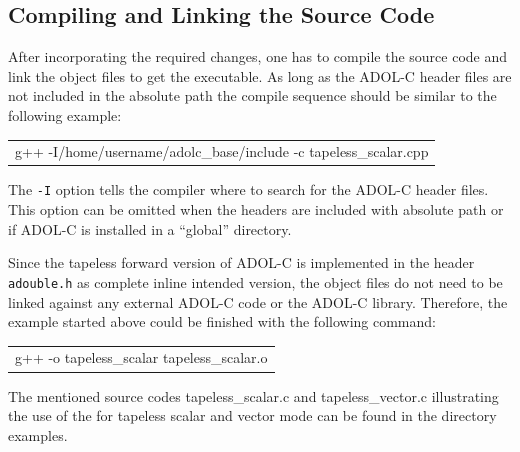 \documentclass[11pt,twoside]{article}
\begin{document}
\subsection{Compiling and Linking the Source Code}
%
After incorporating the required changes, one has to compile the
source code and link the object files to get the executable. 
As long as the ADOL-C header files are not included in the absolute path
the compile sequence should be similar to the following example:
\begin{center}
  \begin{tabular}{l}
    {\sf g++ -I/home/username/adolc\_base/include -c tapeless\_scalar.cpp}
  \end{tabular}
\end{center}
The \verb#-I# option tells the compiler where to search for the ADOL-C
header files. This option can be omitted when the headers are included
with absolute path or if ADOL-C is installed in a ``global'' directory. 

Since the tapeless forward version of ADOL-C is implemented in the
header \verb#adouble.h# as complete inline intended version,
the object files do not need to be linked against any external ADOL-C
code or the ADOL-C library. Therefore, the example started above could be finished with the
following command:
\begin{center}
  \begin{tabular}{l}
    {\sf g++ -o tapeless\_scalar tapeless\_scalar.o}
  \end{tabular}
\end{center}
The mentioned source codes {\sf tapeless\_scalar.c} and {\sf tapeless\_vector.c} 
illustrating the use of the for tapeless scalar and vector mode can be found in
the directory {\sf examples}. 
%
\end{document}

